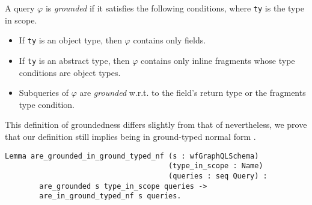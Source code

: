 
\begin{definition}
A \gql query $\varphi$ is \textit{grounded} if it satisfies the following conditions, where \texttt{ty} is the type in scope.
\begin{itemize}
	\item If \texttt{ty} is an object type, then $\varphi$ contains only fields.
	\item If \texttt{ty} is an abstract type, then $\varphi$ contains only inline fragments whose type conditions are object types.
	\item Subqueries of $\varphi$ are \textit{grounded} w.r.t. to the field's return type or the fragments type condition.
\end{itemize}
\end{definition}

This definition of groundedness differs slightly from that of \HP {} nevertheless, we prove that our definition still implies being in ground-typed normal form .

\begin{verbatim}
Lemma are_grounded_in_ground_typed_nf (s : wfGraphQLSchema)
                                      (type_in_scope : Name)
                                      (queries : seq Query) :
        are_grounded s type_in_scope queries ->
        are_in_ground_typed_nf s queries.
\end{verbatim}

